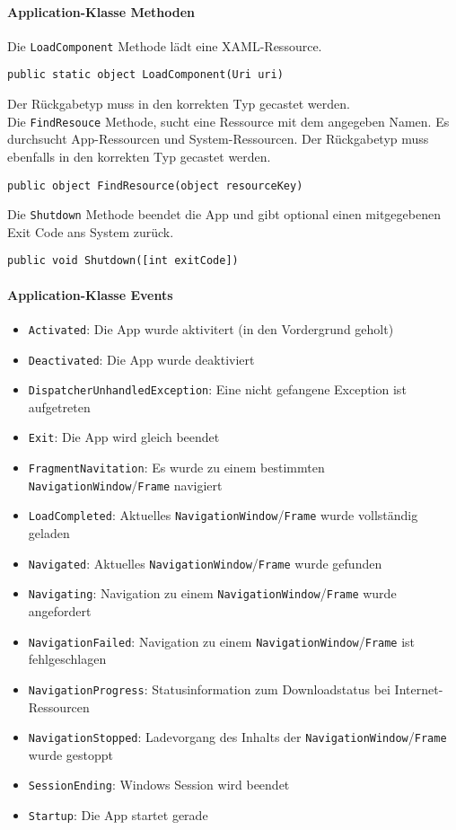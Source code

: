 \paragraph{Application-Klasse Methoden} Die \verb+LoadComponent+ Methode lädt eine XAML-Ressource.
\begin{lstlisting}
public static object LoadComponent(Uri uri)
\end{lstlisting}
Der Rückgabetyp muss in den korrekten Typ gecastet werden.\\
Die \verb+FindResouce+ Methode, sucht eine Ressource mit dem angegeben Namen. Es durchsucht App-Ressourcen und System-Ressourcen. Der Rückgabetyp muss ebenfalls in den korrekten Typ gecastet werden.
\begin{lstlisting}
public object FindResource(object resourceKey)
\end{lstlisting}
Die \verb+Shutdown+ Methode beendet die App und gibt optional einen mitgegebenen Exit Code ans System zurück.
\begin{lstlisting}
public void Shutdown([int exitCode])
\end{lstlisting}
\paragraph{Application-Klasse Events}
\begin{itemize}
\item \verb+Activated+: Die App wurde aktivitert (in den Vordergrund geholt)
\item \verb+Deactivated+: Die App wurde deaktiviert
\item \verb+DispatcherUnhandledException+: Eine nicht gefangene Exception ist aufgetreten
\item \verb+Exit+: Die App wird gleich beendet
\item \verb+FragmentNavitation+: Es wurde zu einem bestimmten \verb+NavigationWindow+/\verb+Frame+ navigiert
\item \verb+LoadCompleted+: Aktuelles \verb+NavigationWindow+/\verb+Frame+ wurde vollständig geladen
\item \verb+Navigated+: Aktuelles \verb+NavigationWindow+/\verb+Frame+ wurde gefunden
\item \verb+Navigating+: Navigation zu einem \verb+NavigationWindow+/\verb+Frame+  wurde angefordert
\item \verb+NavigationFailed+: Navigation zu einem \verb+NavigationWindow+/\verb+Frame+ ist fehlgeschlagen
\item \verb+NavigationProgress+: Statusinformation zum Downloadstatus bei Internet-Ressourcen
\item \verb+NavigationStopped+: Ladevorgang des Inhalts der \verb+NavigationWindow+/\verb+Frame+ wurde gestoppt
\item \verb+SessionEnding+: Windows Session wird beendet
\item \verb+Startup+: Die App startet gerade
\end{itemize}
